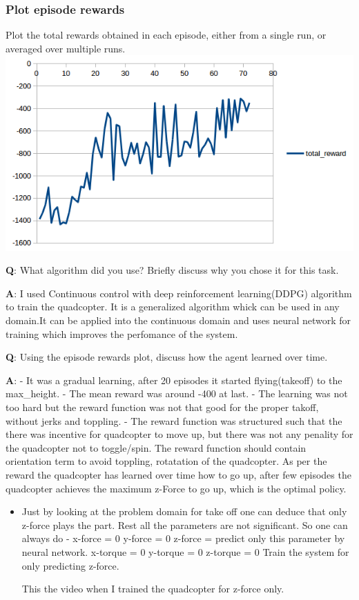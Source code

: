 \documentclass[11pt]{article}
\makeatletter
\def\maxwidth{\ifdim\Gin@nat@width>\linewidth\linewidth
    \else\Gin@nat@width\fi}
\let\Oldincludegraphics\includegraphics
\renewcommand{\includegraphics}[1]{\Oldincludegraphics[width=.8\maxwidth]{#1}}
\makeatother
\begin{document}
\hypertarget{plot-episode-rewards}{%
\subsubsection{Plot episode rewards}\label{plot-episode-rewards}}

Plot the total rewards obtained in each episode, either from a single
run, or averaged over multiple runs.
\includegraphics{images/takeoff.png}

    \textbf{Q}: What algorithm did you use? Briefly discuss why you chose it
for this task.

\textbf{A}: I used Continuous control with deep reinforcement
learning(DDPG) algorithm to train the quadcopter. It is a generalized
algorithm whick can be used in any domain.It can be applied into the
continuous domain and uses neural network for training which improves
the perfomance of the system.

\textbf{Q}: Using the episode rewards plot, discuss how the agent
learned over time.

\textbf{A}: - It was a gradual learning, after 20 episodes it started
flying(takeoff) to the max\_height. - The mean reward was around -400 at
last. - The learning was not too hard but the reward function was not
that good for the proper takoff, without jerks and toppling. - The
reward function was structured such that the there was incentive for
quadcopter to move up, but there was not any penality for the quadcopter
not to toggle/spin. The reward function should contain orientation term
to avoid toppling, rotatation of the quadcopter. As per the reward the
quadcopter has learned over time how to go up, after few episodes the
quadcopter achieves the maximum z-Force to go up, which is the optimal
policy.

\begin{itemize}
\item
  Just by looking at the problem domain for take off one can deduce that
  only z-force plays the part. Rest all the parameters are not
  significant. So one can always do - x-force = 0 y-force = 0 z-force =
  predict only this parameter by neural network. x-torque = 0 y-torque =
  0 z-torque = 0 Train the system for only predicting z-force.

  This the video when I trained the quadcopter for z-force only.
\end{itemize}
\end{document}
